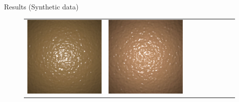 \documentclass[final]{beamer}
\newlength{\twocolwid}
\newlength{\resultwidth}
\begin{document}
\begin{frame}[t]
\begin{columns}[t]
\begin{column}{\twocolwid}
\begin{block}{Results (Synthetic data)}
\begin{figure}[t]
\begin{tabular}{ccrclcccc}
            		\includegraphics[width=\resultwidth]{images/synth/bump/good3.jpg} &
            		\includegraphics[width=\resultwidth]{images/synth/bump/bad1.jpg}
            		\\

\end{tabular}
\end{figure}
\end{block}
\end{column}
\end{columns}
\end{frame}
\end{document}

